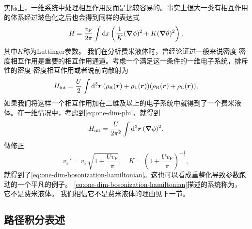 实际上，一维系统中处理相互作用反而是比较容易的。事实上很大一类有相互作用的体系经过玻色化之后也会得到同样的表达式
\begin{equation}
    H = \frac{v_\text{F}}{2\pi} \int \dd{x} \left( \frac{1}{K} (\grad{\phi})^2 + K (\grad{\theta})^2 \right),
    \label{eq:one-dim-bosonization-hamiltonian}
\end{equation}
其中$K$称为Luttinger参数。
我们在分析费米液体时，曾经论证过一般来说密度-密度相互作用是重要的相互作用通道。考虑一个满足这一条件的一维电子系统，排斥性的密度-密度相互作用或者说前向散射为
\begin{equation}
    {H}_\text{int} = \frac{U}{2} \int \dd[3]{\vb*{r}} ({\rho}_\text{R}(\vb*{r}) + {\rho}_\text{L}(\vb*{r})) ({\rho}_\text{R}(\vb*{r}) + {\rho}_\text{L}(\vb*{r})),
\end{equation}
如果我们将这样一个相互作用加在二维及以上的电子系统中就得到了一个费米液体。在一维情况中，考虑到\eqref{eq:one-dim-phi}，就得到
\begin{equation}
    {H}_\text{int} = \frac{U}{2\pi^2} \int \dd[3]{\vb*{r}} (\grad{\phi})^2.
\end{equation}
做修正
\begin{equation}
    v_\text{F}' = v_\text{F} \sqrt{1 + \frac{U v_\text{F}}{\pi}}, \quad K = \left( 1 + \frac{U v_\text{F}}{\pi} \right)^{- \frac{1}{2}},
\end{equation}
就得到了\eqref{eq:one-dim-bosonization-hamiltonian}。这也可以看成重整化导致参数跑动的一个平凡的例子。
\eqref{eq:one-dim-bosonization-hamiltonian}描述的系统称为，它不是费米液体。
我们相信它不是费米液体的理由见下一节。

\subsection{路径积分表述}

